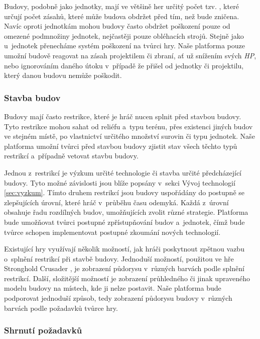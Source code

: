 Budovy, podobně jako jednotky, mají ve většině her určitý počet tzv.  , které určují počet zásahů, které může budova obdržet před tím, než bude zničena. Navíc oproti jednotkám mohou budovy často obdržet poškození pouze od omezené podmnožiny jednotek, nejčastěji pouze obléhacích strojů. Stejně jako u~jednotek přenecháme systém poškození na tvůrci hry. Naše platforma pouze umožní budově reagovat na zásah projektilem či zbraní, ať už snížením svých \textit{HP}, nebo ignorováním daného útoku v~případě že přišel od jednotky či projektilu, který danou budovu nemůže poškodit.


\subsubsection{Stavba budov}
\done
{}
Budovy mají často restrikce, které je hráč nucen splnit před stavbou budovy. Tyto restrikce mohou sahat od reliéfu a~typu terénu, přes existenci jiných budov ve stejném místě, po vlastnictví určitého množství surovin či typu jednotek. Naše platforma umožní tvůrci před stavbou budovy zjistit stav všech těchto typů restrikcí a~případně vetovat stavbu budovy. 

Jednou z~restrikcí je výzkum určité technologie či stavba určité předcházející budovy. Tyto možné závislosti jsou blíže popsány v~sekci Vývoj technologií \ref{sec:vyzkum}. Tímto druhem restrikcí jsou budovy uspořádány do postupně se zlepšujících úrovní, které hráč v~průběhu času odemyká. Každá z~úrovní obsahuje řadu rozdílných budov, umožňujících zvolit různé strategie. Platforma bude umožňovat tvůrci postupné zpřístupňování budov a~jednotek, čímž bude tvůrce schopen implementovat postupné zkoumání nových technologií.

Existující hry využívají několik možností, jak hráči poskytnout zpětnou vazbu o~splnění restrikcí při stavbě budovy. Jednoduší možností, použitou ve hře Stronghold Crusader \citep{site:strongholdcrus}, je zobrazení půdorysu v~různých barvách podle splnění restrikcí. Další, složitější možností je zobrazení průhledného či jinak upraveného modelu budovy na místech, kde ji nelze postavit.  Naše platforma bude podporovat jednoduší způsob, tedy zobrazení půdorysu budovy v~různých barvách podle požadavků tvůrce hry.

\subsubsection{Shrnutí požadavků}

